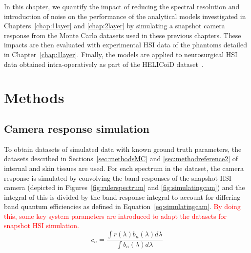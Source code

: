 In this chapter, we quantify the impact of reducing the spectral resolution and introduction of noise on the performance of the analytical models investigated in Chapters~\ref{chap:1layer} and \ref{chap:2layer} by simulating a snapshot camera response from the Monte Carlo datasets used in these previous chapters. These impacts are then evaluated with experimental HSI data of the phantoms detailed in Chapter~\ref{chap:1layer}. Finally, the models are applied to neurosurgical HSI data obtained intra-operatively as part of the HELICoiD dataset~\citep{Fabelo2019}. %

\section{Methods}
\subsection{Camera response simulation}\label{sec:MCcameras}
To obtain datasets of simulated data with known ground truth parameters, the datasets described in Sections~\ref{sec:methodsMC} and \ref{sec:methodreference2} of internal and skin tissues are used. For each spectrum in the dataset, the camera response is simulated by convolving the band responses of the snapshot HSI camera (depicted in Figures~\ref{fig:rulerspectrum} and \ref{fig:simulatingcam}) and the integral of this is divided by the band response integral to account for differing band quantum efficiencies as defined in Equation~\eqref{eq:simulatingcam}. \textcolor{red}{By doing this, some key system parameters are introduced to adapt the datasets for snapshot HSI simulation.}
\begin{equation}
	c_{n} = \frac{\int r(\lambda)b_n(\lambda) d\lambda}{\int b_n(\lambda) d\lambda}
\label{eq:simulatingcam}
\end{equation}
